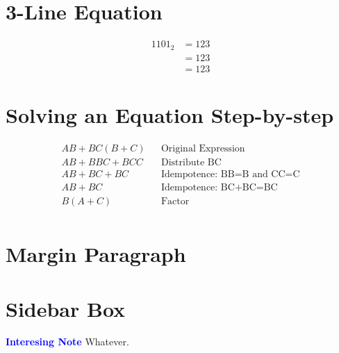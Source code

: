 \section{3-Line Equation}
\begin{align}
	\label{03:eq:identity_example}
	1101_2 &= 123 \\
	\nonumber
	&= 123 \\
	\nonumber
	&= 123
\end{align}


\section{Solving an Equation Step-by-step}
\begin{align}
	\label{04:soln:solving_equation_one}
	AB+BC(B+C) && \text{Original Expression} \\
	\nonumber
	AB+BBC+BCC && \text{Distribute BC} \\
	\nonumber
	AB+BC+BC && \text{Idempotence: BB=B and CC=C} \\
	\nonumber
	AB+BC && \text{Idempotence: BC+BC=BC} \\
	\nonumber
	B(A+C) && \text{Factor} \\
\end{align}

\section{Margin Paragraph} 

\section{Sidebar Box}
\begin{tcolorbox}[colback=blue!5!white,colframe=blue!75!black]
	\textcolor{blue}{\textbf{Interesing Note}}
	\tcblower
	Whatever.
\end{tcolorbox}


